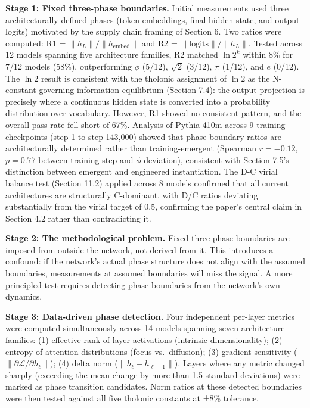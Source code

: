 \documentclass[12pt]{article}
\begin{document}
\textbf{Stage 1: Fixed three-phase boundaries.} Initial measurements
used three architecturally-defined phases (token embeddings, final
hidden state, and output logits) motivated by the supply chain framing
of Section 6. Two ratios were computed: R1 =
\(\|h_L\|/\|h_{\text{embed}}\|\) and R2 = \(\|\text{logits}\|/\|h_L\|\).
Tested across 12 models spanning five architecture families, R2 matched
\(\ln 2^k\) within 8\% for 7/12 models (58\%), outperforming \(\phi\)
(5/12), \(\sqrt{2}\) (3/12), \(\pi\) (1/12), and \(e\) (0/12). The
\(\ln 2\) result is consistent with the tholonic assignment of \(\ln 2\)
as the N-constant governing information equilibrium (Section 7.4): the
output projection is precisely where a continuous hidden state is
converted into a probability distribution over vocabulary. However, R1
showed no consistent pattern, and the overall pass rate fell short of
67\%. Analysis of Pythia-410m across 9 training checkpoints (step 1 to
step 143,000) showed that phase-boundary ratios are architecturally
determined rather than training-emergent (Spearman \(r = -0.12\),
\(p = 0.77\) between training step and \(\phi\)-deviation), consistent
with Section 7.5's distinction between emergent and engineered
instantiation. The D-C virial balance test (Section 11.2) applied across
8 models confirmed that all current architectures are structurally
C-dominant, with D/C ratios deviating substantially from the virial
target of 0.5, confirming the paper's central claim in Section 4.2
rather than contradicting it.

\textbf{Stage 2: The methodological problem.} Fixed three-phase
boundaries are imposed from outside the network, not derived from it.
This introduces a confound: if the network's actual phase structure does
not align with the assumed boundaries, measurements at assumed
boundaries will miss the signal. A more principled test requires
detecting phase boundaries from the network's own dynamics.

\textbf{Stage 3: Data-driven phase detection.} Four independent
per-layer metrics were computed simultaneously across 14 models spanning
seven architecture families: (1) effective rank of layer activations
(intrinsic dimensionality); (2) entropy of attention distributions
(focus vs.~diffusion); (3) gradient sensitivity
(\(\|\partial \mathcal{L}/\partial h_\ell\|\)); (4) delta norm
(\(\|h_\ell - h_{\ell-1}\|\)). Layers where any metric changed sharply
(exceeding the mean change by more than 1.5 standard deviations) were
marked as phase transition candidates. Norm ratios at these detected
boundaries were then tested against all five tholonic constants at ±8\%
tolerance.
\end{document}
